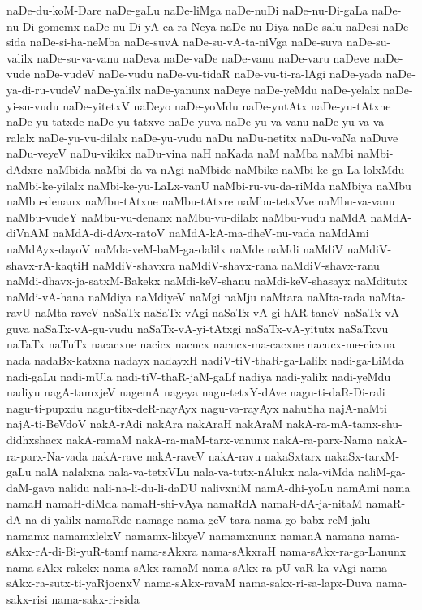 {naDe-du-koM-Dare
naDe-gaLu
naDe-liMga
naDe-nuDi
naDe-nu-Di-gaLa
naDe-nu-Di-gomemx
naDe-nu-Di-yA-ca-ra-Neya
naDe-nu-Diya
naDe-salu
naDesi
naDe-sida
naDe-si-ha-neMba
naDe-suvA
naDe-su-vA-ta-niVga
naDe-suva
naDe-su-valilx
naDe-su-va-vanu
naDeva
naDe-vaDe
naDe-vanu
naDe-varu
naDeve
naDe-vude
naDe-vudeV
naDe-vudu
naDe-vu-tidaR
naDe-vu-ti-ra-lAgi
naDe-yada
naDe-ya-di-ru-vudeV
naDe-yalilx
naDe-yanunx
naDeye
naDe-yeMdu
naDe-yelalx
naDe-yi-su-vudu
naDe-yitetxV
naDeyo
naDe-yoMdu
naDe-yutAtx
naDe-yu-tAtxne
naDe-yu-tatxde
naDe-yu-tatxve
naDe-yuva
naDe-yu-va-vanu
naDe-yu-va-va-ralalx
naDe-yu-vu-dilalx
naDe-yu-vudu
naDu
naDu-netitx
naDu-vaNa
naDuve
naDu-veyeV
naDu-vikikx
naDu-vina
naH
naKada
naM
naMba
naMbi
naMbi-dAdxre
naMbida
naMbi-da-va-nAgi
naMbide
naMbike
naMbi-ke-ga-La-lolxMdu
naMbi-ke-yilalx
naMbi-ke-yu-LaLx-vanU
naMbi-ru-vu-da-riMda
naMbiya
naMbu
naMbu-denanx
naMbu-tAtxne
naMbu-tAtxre
naMbu-tetxVve
naMbu-va-vanu
naMbu-vudeY
naMbu-vu-denanx
naMbu-vu-dilalx
naMbu-vudu
naMdA
naMdA-diVnAM
naMdA-di-dAvx-ratoV
naMdA-kA-ma-dheV-nu-vada
naMdAmi
naMdAyx-dayoV
naMda-veM-baM-ga-dalilx
naMde
naMdi
naMdiV
naMdiV-shavx-rA-kaqtiH
naMdiV-shavxra
naMdiV-shavx-rana
naMdiV-shavx-ranu
naMdi-dhavx-ja-satxM-Bakekx
naMdi-keV-shanu
naMdi-keV-shasayx
naMditutx
naMdi-vA-hana
naMdiya
naMdiyeV
naMgi
naMju
naMtara
naMta-rada
naMta-ravU
naMta-raveV
naSaTx
naSaTx-vAgi
naSaTx-vA-gi-hAR-taneV
naSaTx-vA-guva
naSaTx-vA-gu-vudu
naSaTx-vA-yi-tAtxgi
naSaTx-vA-yitutx
naSaTxvu
naTaTx
naTuTx
nacacxne
nacicx
nacucx
nacucx-ma-cacxne
nacucx-me-cicxna
nada
nadaBx-katxna
nadayx
nadayxH
nadiV-tiV-thaR-ga-Lalilx
nadi-ga-LiMda
nadi-gaLu
nadi-mUla
nadi-tiV-thaR-jaM-gaLf
nadiya
nadi-yalilx
nadi-yeMdu
nadiyu
nagA-tamxjeV
nagemA
nageya
nagu-tetxY-dAve
nagu-ti-daR-Di-rali
nagu-ti-pupxdu
nagu-titx-deR-nayAyx
nagu-va-rayAyx
nahuSha
najA-naMti
najA-ti-BeVdoV
nakA-rAdi
nakAra
nakAraH
nakAraM
nakA-ra-mA-tamx-shu-didhxshacx
nakA-ramaM
nakA-ra-maM-tarx-vanunx
nakA-ra-parx-Nama
nakA-ra-parx-Na-vada
nakA-rave
nakA-raveV
nakA-ravu
nakaSxtarx
nakaSx-tarxM-gaLu
nalA
nalalxna
nala-va-tetxVLu
nala-va-tutx-nAlukx
nala-viMda
naliM-ga-daM-gava
nalidu
nali-na-li-du-li-daDU
nalivxniM
namA-dhi-yoLu
namAmi
nama
namaH
namaH-diMda
namaH-shi-vAya
namaRdA
namaR-dA-ja-nitaM
namaR-dA-na-di-yalilx
namaRde
namage
nama-geV-tara
nama-go-babx-reM-jalu
namamx
namamxlelxV
namamx-lilxyeV
namamxnunx
namanA
namana
nama-sAkx-rA-di-Bi-yuR-tamf
nama-sAkxra
nama-sAkxraH
nama-sAkx-ra-ga-Lanunx
nama-sAkx-rakekx
nama-sAkx-ramaM
nama-sAkx-ra-pU-vaR-ka-vAgi
nama-sAkx-ra-sutx-ti-yaRjocnxV
nama-sAkx-ravaM
nama-sakx-ri-sa-lapx-Duva
nama-sakx-risi
nama-sakx-ri-sida
}
